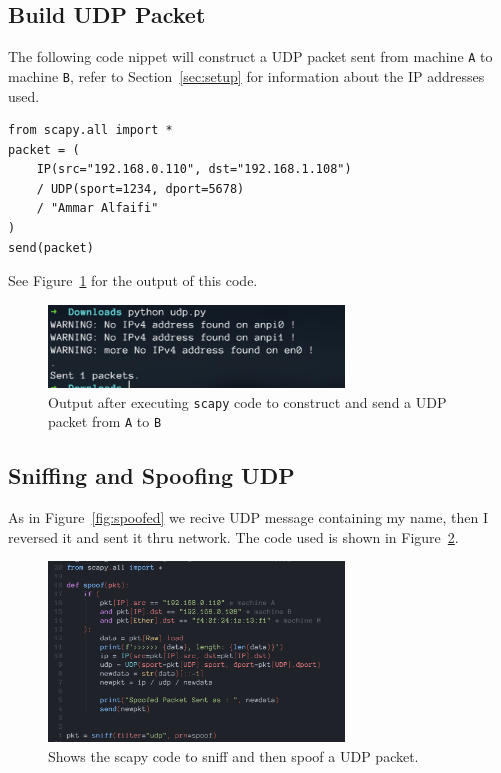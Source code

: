 \documentclass{article}
\def\c#1{\texttt{#1}}
\begin{document}
\subsection{Build UDP Packet} %
\label{sub:Build UDP Packet}
The following code nippet will construct a UDP packet sent from machine \c{A} to machine \c{B}, refer to
Section~\ref{sec:setup} for information about the IP addresses used.
\begin{verbatim}
from scapy.all import *
packet = (
    IP(src="192.168.0.110", dst="192.168.1.108")
    / UDP(sport=1234, dport=5678)
    / "Ammar Alfaifi"
)
send(packet)
\end{verbatim}
See Figure~\ref{fig:udp-output} for the output of this code.
\begin{figure}[hb]
	\centering
	\includegraphics[width=0.7\textwidth]{figures/udp-output.png}
	\caption{Output after executing \c{scapy} code to construct and send a UDP packet from \c{A} to \c{B}}
	\label{fig:udp-output}
\end{figure}


\subsection{Sniffing and Spoofing UDP} %
\label{sub:Sniffing and Spoofing UDP}
As in Figure~\ref{fig:spoofed} we recive UDP message containing my name, then I reversed it and sent it thru network. The code used is shown in Figure~\ref{fig:spoof-code}.
\begin{figure}[hb]
	\centering
	\includegraphics[width=0.7\textwidth]{figures/spoof-code}
	\caption{Shows the scapy code to sniff and then spoof a UDP packet.}
	\label{fig:spoof-code}
\end{figure}
\end{document}
